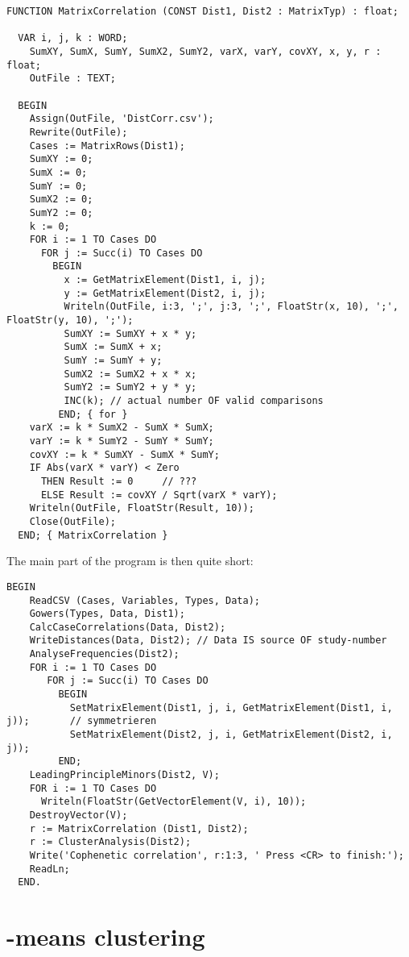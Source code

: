 \begin{refsection}
\begin{lstlisting}[caption=compare distance matrices]
  FUNCTION MatrixCorrelation (CONST Dist1, Dist2 : MatrixTyp) : float;

  VAR i, j, k : WORD;
    SumXY, SumX, SumY, SumX2, SumY2, varX, varY, covXY, x, y, r : float;
    OutFile : TEXT;

  BEGIN
    Assign(OutFile, 'DistCorr.csv');
    Rewrite(OutFile);
    Cases := MatrixRows(Dist1);
    SumXY := 0;
    SumX := 0;
    SumY := 0;
    SumX2 := 0;
    SumY2 := 0;
    k := 0;
    FOR i := 1 TO Cases DO
      FOR j := Succ(i) TO Cases DO
        BEGIN
          x := GetMatrixElement(Dist1, i, j);
          y := GetMatrixElement(Dist2, i, j);
          Writeln(OutFile, i:3, ';', j:3, ';', FloatStr(x, 10), ';', FloatStr(y, 10), ';');
          SumXY := SumXY + x * y;
          SumX := SumX + x;
          SumY := SumY + y;
          SumX2 := SumX2 + x * x;
          SumY2 := SumY2 + y * y;
          INC(k); // actual number OF valid comparisons
         END; { for }
    varX := k * SumX2 - SumX * SumX;
    varY := k * SumY2 - SumY * SumY;
    covXY := k * SumXY - SumX * SumY;
    IF Abs(varX * varY) < Zero
      THEN Result := 0     // ???
      ELSE Result := covXY / Sqrt(varX * varY);
    Writeln(OutFile, FloatStr(Result, 10));
    Close(OutFile);
  END; { MatrixCorrelation }
\end{lstlisting}


The main part of the program is then quite short:

\begin{lstlisting}[caption=Main program]
  BEGIN
    ReadCSV (Cases, Variables, Types, Data);
    Gowers(Types, Data, Dist1);
    CalcCaseCorrelations(Data, Dist2);
    WriteDistances(Data, Dist2); // Data IS source OF study-number
    AnalyseFrequencies(Dist2);
    FOR i := 1 TO Cases DO
       FOR j := Succ(i) TO Cases DO
         BEGIN
           SetMatrixElement(Dist1, j, i, GetMatrixElement(Dist1, i, j));       // symmetrieren
           SetMatrixElement(Dist2, j, i, GetMatrixElement(Dist2, i, j));
         END;
    LeadingPrincipleMinors(Dist2, V);
    FOR i := 1 TO Cases DO
      Writeln(FloatStr(GetVectorElement(V, i), 10));
    DestroyVector(V);
    r := MatrixCorrelation (Dist1, Dist2);
    r := ClusterAnalysis(Dist2);
    Write('Cophenetic correlation', r:1:3, ' Press <CR> to finish:');
    ReadLn;
  END.
\end{lstlisting}

\section{-means clustering}


\end{refsection}
